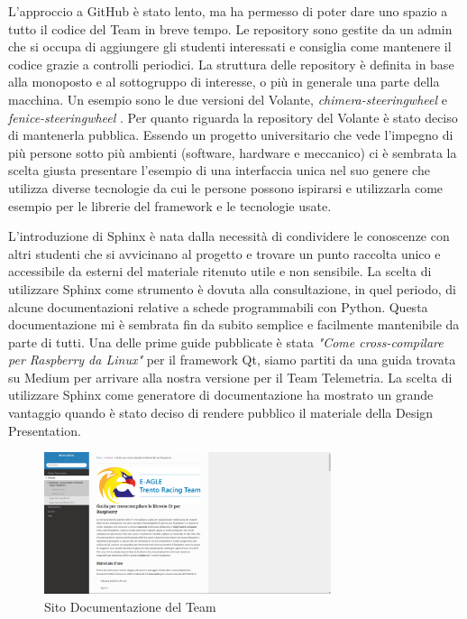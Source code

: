 L'approccio a GitHub è stato lento, ma ha permesso di poter dare uno spazio a tutto il codice del Team in breve tempo.
Le repository sono gestite da un admin che si occupa di aggiungere gli studenti interessati e consiglia come mantenere il codice grazie a controlli periodici.
La struttura delle repository è definita in base alla monoposto e al sottogruppo di interesse, o più in generale una parte della macchina. 
Un esempio sono le due versioni del Volante, \emph{chimera-steeringwheel} \cite{chimera-telemetria} e \emph{fenice-steeringwheel} \cite{fenice-steeringwheel}.
Per quanto riguarda la repository del Volante è stato deciso di mantenerla pubblica.
Essendo un progetto universitario che vede l'impegno di più persone sotto più ambienti (software, hardware e meccanico)
ci è sembrata la scelta giusta presentare l'esempio di una interfaccia unica nel suo genere che utilizza diverse tecnologie
da cui le persone possono ispirarsi e utilizzarla come esempio per le librerie del framework e le tecnologie usate.

L'introduzione di Sphinx è nata dalla necessità di condividere le conoscenze con altri studenti che si avvicinano al progetto 
e trovare un punto raccolta unico e accessibile da esterni del materiale ritenuto utile e non sensibile.
La scelta di utilizzare Sphinx come strumento è dovuta alla consultazione, in quel periodo, di alcune documentazioni relative a schede
programmabili con Python. Questa documentazione mi è sembrata fin da subito semplice e facilmente mantenibile da parte di tutti.
Una delle prime guide pubblicate è stata \emph{"Come cross-compilare per Raspberry da Linux"} per il framework Qt, 
siamo partiti da una guida trovata su Medium \cite{Medium} per arrivare alla nostra versione per il Team Telemetria.
La scelta di utilizzare Sphinx come generatore di documentazione ha mostrato un grande vantaggio quando è stato deciso di rendere pubblico 
il materiale della Design Presentation. 

\begin{figure}[!hbt]
  \centering
  \includegraphics[width=0.75\textwidth]{./figures/sphinx.png}
  \caption{Sito Documentazione del Team \cite{eagletrt.github.io}}
\end{figure}

